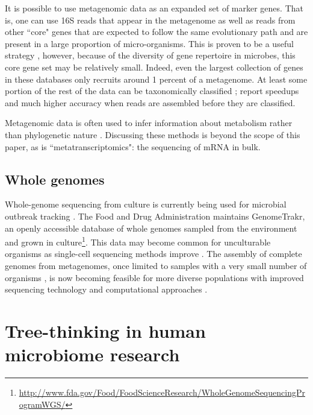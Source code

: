 \documentclass{amsart}
\begin{document}
It is possible to use metagenomic data as an expanded set of marker genes.
That is, one can use 16S reads that appear in the metagenome as well as reads from other ``core" genes that are expected to follow the same evolutionary path and are present in a large proportion of micro-organisms.
This is proven to be a useful strategy \citep{von2007quantitative,wu2008amphora,stark2010mltreemap,kembel2011phylogenetic}, however, because of the diversity of gene repertoire in microbes, this core gene set may be relatively small.
Indeed, even the largest collection of genes in these databases only recruits around 1 percent of a metagenome.
At least some portion of the rest of the data can be taxonomically classified \citep[methods reviewed by][]{mande2012classification}; \citet{treangen2013metamos} report speedups and much higher accuracy when reads are assembled before they are classified.

Metagenomic data is often used to infer information about metabolism rather than phylogenetic nature \citep{greenblum2012metagenomic,abubucker2012metabolic}.
Discussing these methods is beyond the scope of this paper, as is ``metatranscriptomics": the sequencing of mRNA in bulk.


\subsection{Whole genomes}
Whole-genome sequencing from culture is currently being used for microbial outbreak tracking \citep{koser2012rapid,snitkin2012tracking}.
The Food and Drug Administration maintains GenomeTrakr, an openly accessible database of whole genomes sampled from the environment and grown in culture\footnote{\url{http://www.fda.gov/Food/FoodScienceResearch/WholeGenomeSequencingProgramWGS/}}.
This data may become common for unculturable organisms as single-cell sequencing methods improve \citep[reviewed in][]{kalisky2011single}.
The assembly of complete genomes from metagenomes, once limited to samples with a very small number of organisms \citep{baker2010enigmatic}, is now becoming feasible for more diverse populations with improved sequencing technology and computational approaches \citep{howe2012assembling,pell2012scaling,iverson2012untangling,emerson2012metagenomic,podell2013assembly}.


\section{Tree-thinking in human microbiome research}
\end{document}
